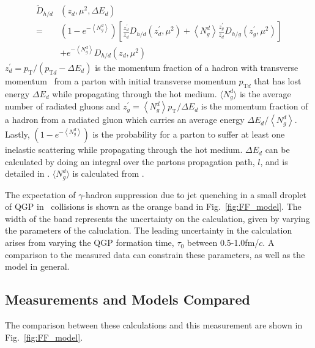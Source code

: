 {\begin{equation}
  \begin{aligned}
    \tilde{D}_{h / d} &\left(z_{d}, \mu^{2}, \Delta E_{d}\right) \\
    =&\left(1-e^{-\left\langle N_{g}^{d}\right\rangle}\right)\left[\frac{z_{d}^{\prime}}{z_{d}} D_{h / d}\left(z_{d}^{\prime}, \mu^{2}\right)+\left\langle N_{g}^{d}\right\rangle \frac{z_{g}^{\prime}}{z_{d}} D_{h / g}\left(z_{g}^{\prime}, \mu^{2}\right)\right] \\
     &+e^{-\left\langle N_{g}^{d}\right\rangle} D_{h / d}\left(z_{d}, \mu^{2}\right)
  \end{aligned}
\end{equation}
$z_{d}^{\prime}=p_{\mathrm{T}} /\left(p_{\mathrm{T} d}-\Delta E_{d}\right)$ is the momentum fraction of a hadron with transverse momentum \pt~from a parton with initial transverse momentum $p_{\mathrm{T}d}$ that has lost energy $\Delta E_d$ while propagating through the hot medium.  $\langle N_g^d \rangle$ is the average number of radiated gluons and $z_{g}^{\prime}=\left\langle N_{g}^{d}\right\rangle p_{\mathrm{T}} / \Delta E_{d}$ is the momentum fraction of a hadron from a radiated gluon which carries an average energy $\Delta E_{d} /\left\langle N_{g}^{d}\right\rangle$. Lastly, $\left(1-e^{-\left\langle N_{g}^{d}\right\rangle}\right)$ is the probability for a parton to suffer at least one inelastic scattering while propagating through the hot medium. $\Delta E_{d}$ can be calculated by doing an integral over the partons propagation path, $l$, and is detailed in \cite{Wang2002}. $\langle N_g^d \rangle$ is calculated from \cite{Chang2014}.

The expectation of $\gamma$-hadron suppression due to jet quenching in a small droplet of QGP in \pPb~collisions is shown as the orange band in Fig.~\ref{fig:FF_model}. The width of the band represents the uncertainty on the calculation, given by varying the parameters of the caluclation. The leading uncertainty in the calculation arises from varying the QGP formation time, $\tau_0$ between 0.5-1.0fm/$c$. A comparison to the measured data can constrain these parameters, as well as the model in general.

\subsection{Measurements and Models Compared}
\label{sec:comparison}

The comparison between these calculations and this measurement are shown in Fig.~\ref{fig:FF_model}.

}
